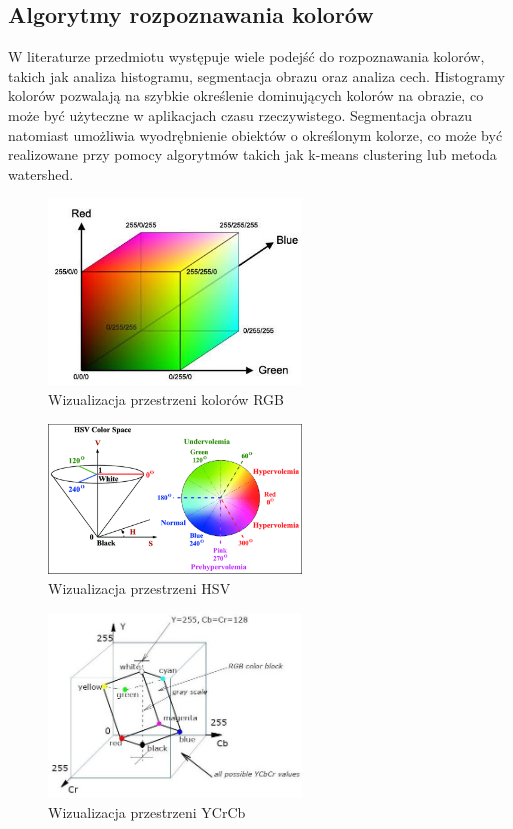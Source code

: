 \subsection{Algorytmy rozpoznawania kolorów}

W literaturze przedmiotu występuje wiele podejść do rozpoznawania kolorów, takich jak analiza histogramu, segmentacja obrazu oraz analiza cech. Histogramy kolorów pozwalają na szybkie określenie dominujących kolorów na obrazie, co może być użyteczne w aplikacjach czasu rzeczywistego. Segmentacja obrazu natomiast umożliwia wyodrębnienie obiektów o określonym kolorze, co może być realizowane przy pomocy algorytmów takich jak k-means clustering lub metoda watershed.


\begin{figure}[h!]
    \centering
    \includegraphics[width=0.6\textwidth]{./graf/rgb-model.png}
    \caption{Wizualizacja przestrzeni kolorów RGB \cite{bib:rgb-model}}
    \label{rys2:rgb1}
\end{figure}

\begin{figure}[h!]
    \centering
    \includegraphics[width=0.6\textwidth]{./graf/hsv-model.png}
    \caption{Wizualizacja przestrzeni HSV \cite{bib:hsv-model}}
    \label{rys2:hsv1}
\end{figure}

\begin{figure}[h!]
    \centering
    \includegraphics[width=0.6\textwidth]{./graf/ycrcb-model.png}
    \caption{Wizualizacja przestrzeni YCrCb \cite{bib:ycrcb-model}}
    \label{rys2:ycrcb1}
\end{figure}